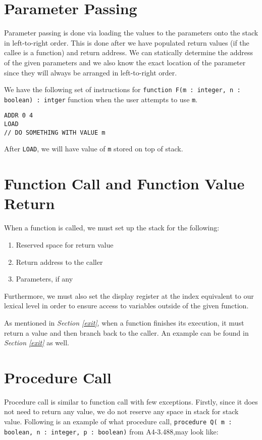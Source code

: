 \documentclass{article}
\begin{document}
\section{Parameter Passing}

Parameter passing is done via loading the values to the parameters onto the stack in left-to-right order. This is done after we have populated return values (if the callee is a function) and return address. We can statically determine the address of the given parameters and we also know the exact location of the parameter since they will always be arranged in left-to-right order.

We have the following set of instructions for {\tt function F(m : integer, n : boolean) : intger} function when the user attempts to use {\tt m}.

\begin{lstlisting}
ADDR 0 4
LOAD
// DO SOMETHING WITH VALUE m
\end{lstlisting}

After {\tt LOAD}, we will have value of {\tt m} stored on top of stack.

\section{Function Call and Function Value Return}

When a function is called, we must set up the stack for the following:

\begin{enumerate}
	\item Reserved space for return value
	\item Return address to the caller
	\item Parameters, if any
\end{enumerate}

Furthermore, we must also set the display register at the index equivalent to our lexical level in order to ensure access to variables outside of the given function.

As mentioned in {\it Section \ref{exit}}, when a function finishes its execution, it must return a value and then branch back to the caller. An example can be found in {\it Section \ref{exit}} as well.

\section{Procedure Call}

Procedure call is similar to function call with few exceptions. Firstly, since it does not need to return any value, we do not reserve any space in stack for stack value. Following is an example of what procedure call, {\tt procedure Q( m : boolean, n : integer, p : boolean)} from A4-3.488,may look like:
\end{document}
